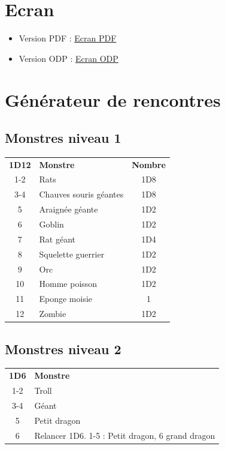 \documentclass[a4paper, 11pt, twoside]{article}
\begin{document}
\section{Ecran}
\label{sec:orgffd223b}

\begin{itemize}
\item Version PDF : \href{https://github.com/orey/jdr/blob/master/DungeonSquad-fr/DungeonSquadFr-Ecran.pdf}{Ecran PDF}
\item Version ODP : \href{https://github.com/orey/jdr/blob/master/DungeonSquad-fr/DungeonSquadFr-Ecran.odp}{Ecran ODP}
\end{itemize}

\section{Générateur de rencontres}
\label{sec:org9636d56}

\subsection{Monstres niveau 1}
\label{sec:orgd7e242f}

\begin{longtable}{clc}
\textbf{1D12} & \textbf{Monstre} & \textbf{Nombre}\\
1-2 & Rats & 1D8\\
3-4 & Chauves souris géantes & 1D8\\
5 & Araignée géante & 1D2\\
6 & Goblin & 1D2\\
7 & Rat géant & 1D4\\
8 & Squelette guerrier & 1D2\\
9 & Orc & 1D2\\
10 & Homme poisson & 1D2\\
11 & Eponge moisie & 1\\
12 & Zombie & 1D2\\
\end{longtable}

\subsection{Monstres niveau 2}
\label{sec:org437bf43}

\begin{longtable}{cl}
\textbf{1D6} & \textbf{Monstre}\\
1-2 & Troll\\
3-4 & Géant\\
5 & Petit dragon\\
6 & Relancer 1D6. 1-5 : Petit dragon, 6 grand dragon\\
\end{longtable}
\end{document}
